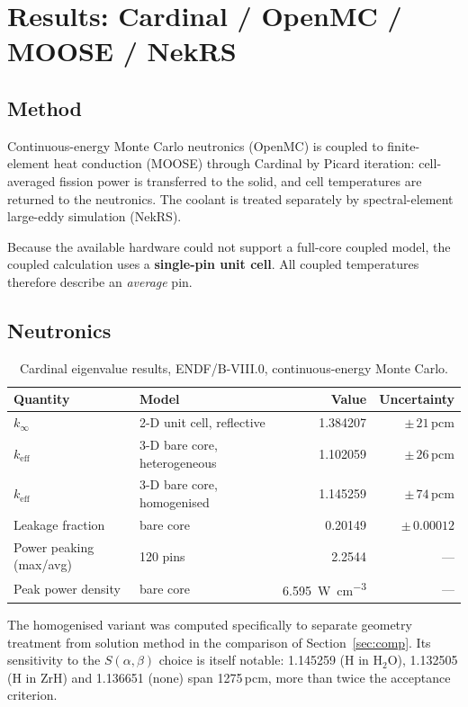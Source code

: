 \documentclass[11pt,a4paper]{article}
\newcommand{\keff}{\ensuremath{k_{\mathrm{eff}}}}
\newcommand{\kinf}{\ensuremath{k_{\infty}}}
\newcommand{\pcm}{\,pcm}
\begin{document}
\newpage
\section{Results: Cardinal / OpenMC / MOOSE / NekRS}
\subsection{Method}
Continuous-energy Monte Carlo neutronics (OpenMC) is coupled to finite-element heat
conduction (MOOSE) through Cardinal by Picard iteration: cell-averaged fission power is
transferred to the solid, and cell temperatures are returned to the neutronics. The coolant
is treated separately by spectral-element large-eddy simulation (NekRS).

Because the available hardware could not support a full-core coupled model, the coupled
calculation uses a \textbf{single-pin unit cell}. All coupled temperatures therefore
describe an \emph{average} pin.

\subsection{Neutronics}
\begin{table}[H]\centering\small
\caption{Cardinal eigenvalue results, ENDF/B-VIII.0, continuous-energy Monte Carlo.}
\begin{tabular}{@{}llrr@{}}
\toprule
\textbf{Quantity} & \textbf{Model} & \textbf{Value} & \textbf{Uncertainty}\\
\midrule
\kinf & 2-D unit cell, reflective & 1.384207 & $\pm\,21$\pcm\\
\keff & 3-D bare core, heterogeneous & 1.102059 & $\pm\,26$\pcm\\
\keff & 3-D bare core, homogenised & 1.145259 & $\pm\,74$\pcm\\
Leakage fraction & bare core & 0.20149 & $\pm\,0.00012$\\
Power peaking (max/avg) & 120 pins & 2.2544 & ---\\
Peak power density & bare core & \SI{6.595}{\watt\per\cubic\centi\meter} & ---\\
\bottomrule
\end{tabular}
\end{table}

The homogenised variant was computed specifically to separate geometry treatment from
solution method in the comparison of Section~\ref{sec:comp}. Its sensitivity to the
$S(\alpha,\beta)$ choice is itself notable: 1.145259 (H in H$_2$O), 1.132505 (H in ZrH) and
1.136651 (none) span 1275\pcm, more than twice the acceptance criterion.
\end{document}
